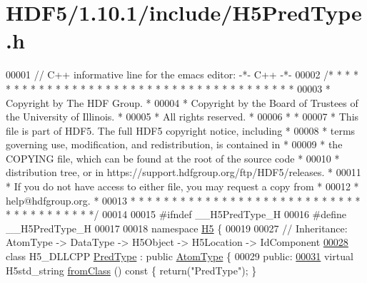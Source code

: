 \hypertarget{_h_d_f5_21_810_81_2include_2_h5_pred_type_8h_source}{}\section{H\+D\+F5/1.10.1/include/\+H5\+Pred\+Type.h}
\label{_h_d_f5_21_810_81_2include_2_h5_pred_type_8h_source}

\begin{DoxyCode}
00001 \textcolor{comment}{// C++ informative line for the emacs editor: -*- C++ -*-}
00002 \textcolor{comment}{/* * * * * * * * * * * * * * * * * * * * * * * * * * * * * * * * * * * * * * *}
00003 \textcolor{comment}{ * Copyright by The HDF Group.                                               *}
00004 \textcolor{comment}{ * Copyright by the Board of Trustees of the University of Illinois.         *}
00005 \textcolor{comment}{ * All rights reserved.                                                      *}
00006 \textcolor{comment}{ *                                                                           *}
00007 \textcolor{comment}{ * This file is part of HDF5.  The full HDF5 copyright notice, including     *}
00008 \textcolor{comment}{ * terms governing use, modification, and redistribution, is contained in    *}
00009 \textcolor{comment}{ * the COPYING file, which can be found at the root of the source code       *}
00010 \textcolor{comment}{ * distribution tree, or in https://support.hdfgroup.org/ftp/HDF5/releases.  *}
00011 \textcolor{comment}{ * If you do not have access to either file, you may request a copy from     *}
00012 \textcolor{comment}{ * help@hdfgroup.org.                                                        *}
00013 \textcolor{comment}{ * * * * * * * * * * * * * * * * * * * * * * * * * * * * * * * * * * * * * * */}
00014 
00015 \textcolor{preprocessor}{#ifndef \_\_H5PredType\_H}
00016 \textcolor{preprocessor}{#define \_\_H5PredType\_H}
00017 
00018 \textcolor{keyword}{namespace }\hyperlink{namespace_h5}{H5} \{
00019 
00027 \textcolor{comment}{//  Inheritance: AtomType -> DataType -> H5Object -> H5Location -> IdComponent}
\hyperlink{class_h5_1_1_pred_type}{00028} \textcolor{keyword}{class }H5\_DLLCPP \hyperlink{class_h5_1_1_pred_type}{PredType} : \textcolor{keyword}{public} \hyperlink{class_h5_1_1_atom_type}{AtomType} \{
00029    \textcolor{keyword}{public}:
\hyperlink{class_h5_1_1_pred_type_a75af31606c502672b4c55947f11a9632}{00031}         \textcolor{keyword}{virtual} H5std\_string \hyperlink{class_h5_1_1_pred_type_a75af31606c502672b4c55947f11a9632}{fromClass} ()\textcolor{keyword}{ const }\{ \textcolor{keywordflow}{return}(\textcolor{stringliteral}{"PredType"}); \}

\end{DoxyCode}
